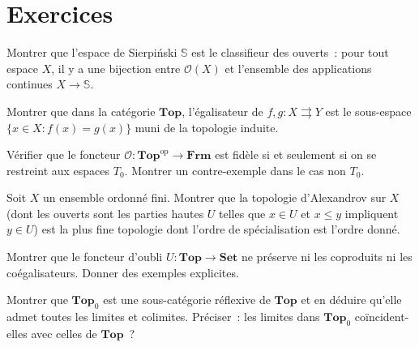 \section{Exercices}

\begin{exercice}
Montrer que l'espace de Sierpi\'nski $\mathbb{S}$ est le classifieur des ouverts~: pour
tout espace $X$, il y a une bijection entre $\mathcal{O}(X)$ et l'ensemble des applications
continues $X \to \mathbb{S}$.
\end{exercice}

\begin{exercice}
Montrer que dans la cat\'egorie $\mathbf{Top}$, l'\'egalisateur de $f,g\colon X
\rightrightarrows Y$ est le sous-espace $\{x \in X : f(x) = g(x)\}$ muni de la topologie
induite.
\end{exercice}

\begin{exercice}
V\'erifier que le foncteur $\mathcal{O}\colon \mathbf{Top}^{\mathrm{op}} \to \mathbf{Frm}$
est fid\`ele si et seulement si on se restreint aux espaces $T_0$. Montrer un
contre-exemple dans le cas non $T_0$.
\end{exercice}

\begin{exercice}
Soit $X$ un ensemble ordonn\'e fini. Montrer que la topologie d'Alexandrov sur $X$ (dont
les ouverts sont les parties hautes $U$ telles que $x \in U$ et $x \leq y$ impliquent
$y \in U$) est la plus fine topologie dont l'ordre de sp\'ecialisation est l'ordre donn\'e.
\end{exercice}

\begin{exercice}
Montrer que le foncteur d'oubli $U\colon \mathbf{Top} \to \mathbf{Set}$ ne pr\'eserve ni
les coproduits ni les co\'egalisateurs. Donner des exemples explicites.
\end{exercice}

\begin{exercice}
Montrer que $\mathbf{Top}_0$ est une sous-cat\'egorie r\'eflexive de $\mathbf{Top}$ et en
d\'eduire qu'elle admet toutes les limites et colimites. Pr\'eciser~: les limites dans
$\mathbf{Top}_0$ co\"incident-elles avec celles de $\mathbf{Top}$~?
\end{exercice}
